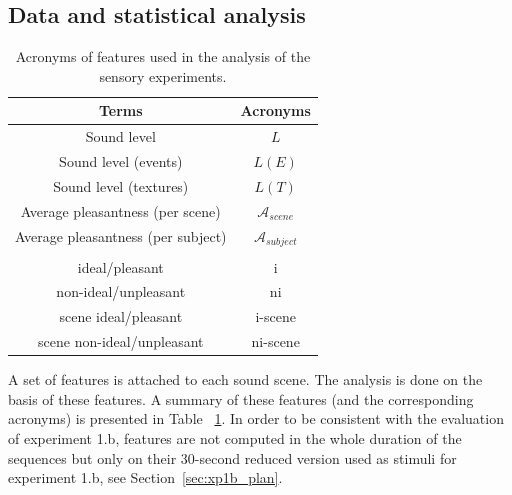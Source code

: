 \documentclass[12pt]{elsarticle}
\newcommand{\cf}{cf.}
\begin{document}
\subsection{Data and statistical analysis}
\label{sec:xp1_dataAna}

\begin{table}[t]
\centering
\begin{tabular}{c c}
Terms                              & Acronyms                   \\
\hline
Sound level                        & $L$                        \\
Sound level (events)               & $L(E)$                     \\
Sound level (textures)             & $L(T)$                     \\
Average pleasantness (per scene)   & $\mathcal{A}_{scene}$      \\
Average pleasantness (per subject) & $\mathcal{A}_{subject}$      \\
                                   &                            \\
ideal/pleasant                     & i                          \\
non-ideal/unpleasant               & ni                         \\
scene ideal/pleasant               & i-scene                    \\
scene non-ideal/unpleasant         & ni-scene                   \\
\hline
\end{tabular}
\vspace{0.5mm}
\caption{Acronyms of features used in the analysis of the sensory experiments.}
\label{tab:acronyme}
\end{table}


A set of features is attached to each sound scene. The analysis is done on the basis of these features. A summary of these features (and the corresponding acronyms) is presented in Table ~\ref{tab:acronyme}. In order to be consistent with the evaluation of experiment 1.b, features are not computed in the whole duration of the sequences but only on their 30-second reduced version used as stimuli for experiment 1.b, see Section~\ref{sec:xp1b_plan}.
\end{document}
